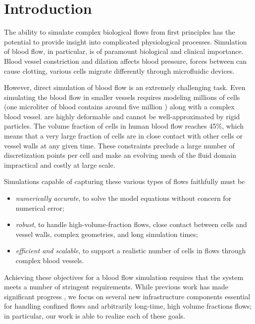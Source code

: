 \section{Introduction\label{sec:intro}}
The ability to simulate complex biological flows from first principles
has the potential to provide  insight into complicated physiological processes. 
Simulation of blood flow, in particular, is of paramount biological and clinical importance.
Blood vessel constriction and dilation affects blood pressure, forces between \rbcs can cause clotting, various cells migrate differently through microfluidic devices.


However, direct simulation of blood flow is an extremely challenging task.
Even simulating the blood flow in smaller vessels requires modeling millions of cells (one microliter of blood contains around five million \rbcs) along with a complex blood vessel.
\rbcs are highly deformable and cannot be well-approximated by rigid particles.
The volume fraction of cells in human blood flow reaches 45\%, which means that a very large fraction of cells are in close contact with other cells or vessel walls at any given time.
These constraints preclude a large number of discretization points per cell and make an evolving mesh of the fluid domain impractical and costly at large scale.

Simulations capable of capturing these various types of flows faithfully must be
\begin{itemize}
\item \emph{numerically accurate}, to solve the model equations without
  concern for numerical error;
\item \emph{robust}, to handle high-volume-fraction flows, close contact between cells and vessel walls, complex geometries, and long simulation times;
\item \emph{efficient and scalable}, to support a realistic number of cells in
  flows through complex blood vessels.
\end{itemize}

Achieving these objectives for a blood flow simulation requires that the system meets a number of stringent requirements.
While previous work has made significant progress \cite{Malhotra2017,lu2018parallel,rahimian2010petascale}, we focus on several new infrastructure components essential for handling confined flows and arbitrarily long-time, high volume fractions \rbc flows; in particular, our work is able to realize each of these goals.

